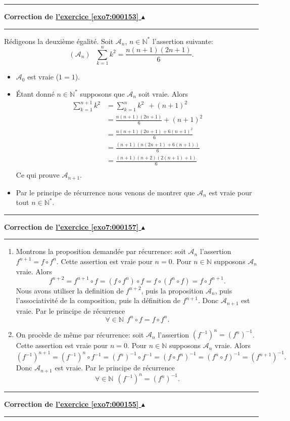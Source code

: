 \documentclass[11pt,a4paper]{article}
\newcommand{\Nn}{\mathbb{N}} \newcommand{\N}{\mathbb{N}}
\newcounter{exo}
\newcommand{\correction}[1]{\hypertarget{cor7:#1}{}\label{cor7:#1}{\bf Correction de \hyperlink{exo7:#1}{l'exercice \ref{exo7:#1} $\blacktriangle$}}\vspace{1mm}\hrule\vspace{1mm}}
\newcommand{\fincorrection}{\vspace{1mm}\hrule\vspace*{7mm}}
\begin{document}
\fincorrection
\correction{000153}
R\'edigeons la deuxi\`eme \'egalit\'e.
Soit $\mathcal{A}_n$, $n\in \Nn^*$ l'assertion suivante:
$$(\mathcal{A}_n) \ \ \ \sum_{k=1}^n k^2= \frac{n(n+1)(2n+1)}{6}.$$
\begin{itemize}
  \item $\mathcal{A}_0$ est vraie ($1=1$).
  \item \'Etant donn\'e $n\in\Nn^*$ supposons que $\mathcal{A}_n$
soit vraie. Alors
\begin{align*}
\sum_{k=1}^{n+1} k^2
  &= \sum_{k=1}^n k^2 \ \ + (n+1)^2 \\
  &= \frac{n(n+1)(2n+1)}{6} + (n+1)^2\\
  &= \frac{n(n+1)(2n+1)+6(n+1)^2}{6} \\
  &= \frac{(n+1)(n(2n+1)+6(n+1))}{6} \\
  &= \frac{(n+1)(n+2)(2(n+1)+1)}{6} \\
\end{align*}
Ce qui prouve $\mathcal{A}_{n+1}$.
  \item Par le principe de r\'ecurrence nous venons de montrer 
que $\mathcal{A}_n$ est vraie pour tout $n\in\Nn^*$.
\end{itemize}
\fincorrection
\correction{000157}
\begin{enumerate}
\item Montrons la proposition demand\'ee par r\'ecurrence:
soit $\mathcal{A}_{n}$ l'assertion $f^{n + 1} = f \circ f^n$.
Cette assertion est vraie pour $n=0$. Pour $n\in \Nn$ supposons
$\mathcal{A}_{n}$ vraie. Alors
$$f^{n + 2} = f^{n + 1} \circ f = (f \circ f^n) \circ f = f \circ (f^n \circ f) = f \circ f^{n + 1}.$$
Nous avons utiliser la definition de $f^{n + 2}$, puis la proposition $\mathcal{A}_{n}$,
puis l'associativit\'e de la composition, puis la d\'efinition de $f^{n + 1}$.
Donc $\mathcal{A}_{n+1}$ est vraie. Par le principe de r\'ecurrence
$$\forall \in \Nn \ \ f^n\circ f = f\circ f^n.$$

\item On proc\`ede de m\^eme par r\'ecurrence:
soit $\mathcal{A}_{n}$ l'assertion $ (f^{-1})^n  = (f^n)^{-1}$.
Cette assertion est vraie pour $n=0$. Pour $n\in \Nn$ supposons
$\mathcal{A}_{n}$ vraie. Alors
$$(f^{-1})^{n+1} = (f^{-1})^{n} \circ f^{-1} = (f^n)^{-1} \circ f^{-1} = (f\circ f^n)^{-1} =
 ( f^n \circ f)^{-1} = ( f^{n+1})^{-1} .$$
Donc $\mathcal{A}_{n+1}$ est vraie. Par le principe de r\'ecurrence
$$\forall \in \Nn \ \ (f^{-1})^n
 = (f^n)^{-1}.$$
\end{enumerate}
\fincorrection
\correction{000155}
\end{document}
